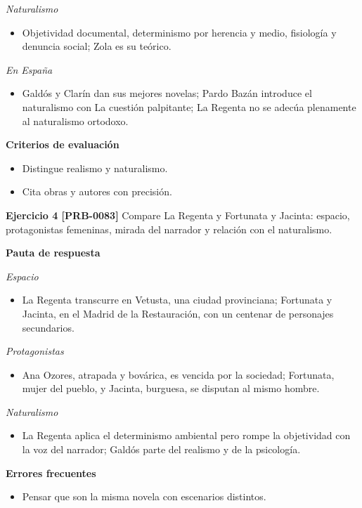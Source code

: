 \documentclass{book}
\begin{document}
\noindent\textit{Naturalismo}
\begin{itemize}
\item Objetividad documental, determinismo por herencia y medio, fisiología y denuncia social; Zola es su teórico.
\end{itemize}

\noindent\textit{En España}
\begin{itemize}
\item Galdós y Clarín dan sus mejores novelas; Pardo Bazán introduce el naturalismo con La cuestión palpitante; La Regenta no se adecúa plenamente al naturalismo ortodoxo.
\end{itemize}

\noindent\textbf{Criterios de evaluación}
\begin{itemize}
\item Distingue realismo y naturalismo.
\item Cita obras y autores con precisión.
\end{itemize}

\noindent\textbf{Ejercicio 4 [PRB-0083]}
Compare La Regenta y Fortunata y Jacinta: espacio, protagonistas femeninas, mirada del narrador y relación con el naturalismo.


\noindent\textbf{Pauta de respuesta}

\noindent\textit{Espacio}
\begin{itemize}
\item La Regenta transcurre en Vetusta, una ciudad provinciana; Fortunata y Jacinta, en el Madrid de la Restauración, con un centenar de personajes secundarios.
\end{itemize}

\noindent\textit{Protagonistas}
\begin{itemize}
\item Ana Ozores, atrapada y bovárica, es vencida por la sociedad; Fortunata, mujer del pueblo, y Jacinta, burguesa, se disputan al mismo hombre.
\end{itemize}

\noindent\textit{Naturalismo}
\begin{itemize}
\item La Regenta aplica el determinismo ambiental pero rompe la objetividad con la voz del narrador; Galdós parte del realismo y de la psicología.
\end{itemize}

\noindent\textbf{Errores frecuentes}
\begin{itemize}
\item Pensar que son la misma novela con escenarios distintos.
\end{itemize}
\end{document}

